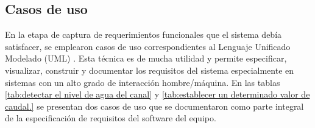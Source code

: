 \vspace{3cm}

\subsection{Casos de uso}
\label{subsec:Casos de uso}
En la etapa de captura de requerimientos funcionales que el sistema debía satisfacer, se emplearon casos de uso correspondientes al Lenguaje Unificado Modelado (UML) \citep{LIBROUML}. Esta técnica es de mucha utilidad y permite especificar, visualizar, construir y documentar los requisitos del sistema especialmente en sistemas con un alto grado de interacción hombre/máquina. 
En las tablas \ref{tab:detectar el nivel de agua del canal} y \ref{tab:establecer un determinado valor de caudal.} se presentan dos casos de uso que se documentaron como parte integral de la especificación de requisitos del software del equipo.


